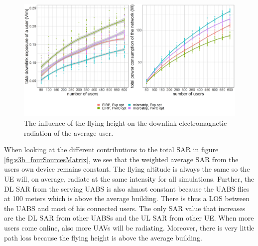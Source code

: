 \documentclass[twocolumn]{phdsymp} %
\begin{document}
\begin{figure}[h!]
  \includegraphics[width=\linewidth]{../results/s3/uvsdlAndPc.png}
  \caption{The influence of the flying height on the downlink electromagnetic radiation of the average user.}
  \label{fig:s3b_dlAndPC}
\end{figure}

When looking at the different contributions to the total \gls{SAR} in figure \ref{fig:s3b_fourSourcesMatrix}, 
we see that the weighted average 
\gls{SAR} from the users own device remains constant. The flying altitude is always the same so the
 \gls{UE} will, on average, radiate at the same intensity for all simulations.
 Further, the \gls{DL} \gls{SAR} from the serving \gls{UABS} is also almost constant because the \gls{UABS} flies at 100 meters which is
above the average building. There is thus a \gls{LOS} between the \gls{UABS} and most of his connected users.
The only \gls{SAR} value that increases are the \gls{DL} \gls{SAR} from other \gls{UABS}s and the \gls{UL} \gls{SAR} from other \gls{UE}. 
When more users come online, also more \gls{UAV}s will be radiating. Moreover, there is very little path loss because the flying height is above the average building.
\end{document}
